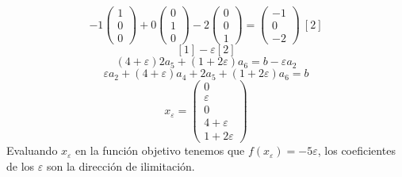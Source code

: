 \documentclass[11pt,fleqn]{book} %
\begin{document}
$$-1 \left(\begin{array}{c}
1 \\ 0 \\ 0
\end{array}\right)+0\left(\begin{array}{c}
0 \\ 1 \\ 0
\end{array}\right)-2\left(\begin{array}{c}
0 \\ 0 \\ 1
\end{array}\right)=\left(\begin{array}{c}
-1 \\ 0 \\ -2
\end{array}\right) ~ [2]$$
$$[1]-\varepsilon[2]$$
$$(4+\varepsilon)2a_5+(1+2\varepsilon)a_6=b-\varepsilon a_2 $$
$$ \varepsilon a_2 + (4+\varepsilon)a_4+2a_5+(1+2\varepsilon)a_6=b$$
$$ x_\varepsilon=\left(\begin{array}{c}
0 \\ \varepsilon \\ 0 \\ 4 + \varepsilon \\ 1 + 2\varepsilon
\end{array}\right)$$
Evaluando $x_\varepsilon$ en la función objetivo tenemos que $f(x_\varepsilon)=-5 \varepsilon$, los coeficientes de los $\varepsilon$ son la dirección de ilimitación.
\end{document}
